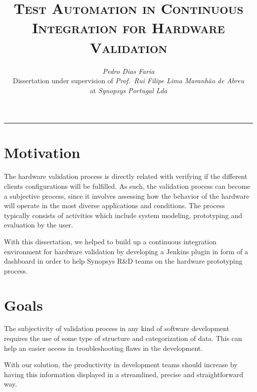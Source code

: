 \documentclass[9pt,a4paper]{extarticle}
\begin{document}
\title{\vspace*{-8mm}\textbf{\textsc{Test Automation in Continuous Integration for Hardware Validation}}}
\author{\emph{Pedro Dias Faria}\\[2mm]
\small{Dissertation under supervision of \emph{Prof.\ Rui Filipe Lima Maranhão de Abreu}}\\
\small{at \emph{Synopsys Portugal Lda}}}
\date{}
\maketitle
\thispagestyle{empty}

\vspace*{-4mm}\noindent\rule{\textwidth}{0.4pt}\vspace*{4mm}

\begin{multicols}{2}

\section{Motivation}\label{sec:motiva}

The hardware validation process is directly related with verifying if the different clients configurations will be fulfilled. As such, the validation process can become a subjective process, since it involves assessing how the behavior of the hardware will operate in the most diverse applications and conditions. The process typically consists of activities which include system modeling, prototyping and evaluation by the user\cite{TroyScott}\cite{Puri-Jobi2015}.

With this dissertation, we helped to build up a continuous integration environment for hardware validation by developing a Jenkins plugin in form of a dashboard in order to help Synopsys R\&D teams on the hardware prototyping process. 

\section{Goals}\label{sec:goals}
The subjectivity of validation process in any kind of software development requires the use of some type of structure and categorization of data. This can help an easier access in troubleshooting flaws in the development.

With our solution, the productivity in development teams should increase by having this information displayed in a streamlined, precise and straightforward way.


\end{multicols}
\end{document}
